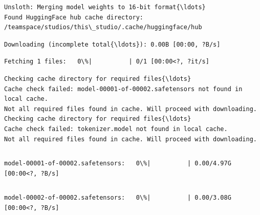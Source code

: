 \documentclass[11pt]{article}
\begin{document}
    \begin{Verbatim}[commandchars=\\\{\}]
Unsloth: Merging model weights to 16-bit format{\ldots}
Found HuggingFace hub cache directory:
/teamspace/studios/this\_studio/.cache/huggingface/hub
    \end{Verbatim}

    
    \begin{Verbatim}[commandchars=\\\{\}]
Downloading (incomplete total{\ldots}): 0.00B [00:00, ?B/s]
    \end{Verbatim}

    
    
    \begin{Verbatim}[commandchars=\\\{\}]
Fetching 1 files:   0\%|          | 0/1 [00:00<?, ?it/s]
    \end{Verbatim}

    
    \begin{Verbatim}[commandchars=\\\{\}]
Checking cache directory for required files{\ldots}
Cache check failed: model-00001-of-00002.safetensors not found in local cache.
Not all required files found in cache. Will proceed with downloading.
Checking cache directory for required files{\ldots}
Cache check failed: tokenizer.model not found in local cache.
Not all required files found in cache. Will proceed with downloading.
    \end{Verbatim}

    \begin{Verbatim}[commandchars=\\\{\}]

    \end{Verbatim}

    
    \begin{Verbatim}[commandchars=\\\{\}]
model-00001-of-00002.safetensors:   0\%|          | 0.00/4.97G [00:00<?, ?B/s]
    \end{Verbatim}

    
    \begin{Verbatim}[commandchars=\\\{\}]

    \end{Verbatim}

    
    \begin{Verbatim}[commandchars=\\\{\}]
model-00002-of-00002.safetensors:   0\%|          | 0.00/3.08G [00:00<?, ?B/s]
    \end{Verbatim}
\end{document}

